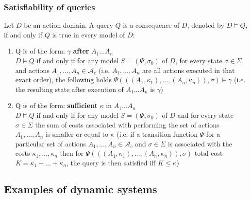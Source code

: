 \documentclass[a4paper]{article}
\begin{document}
\subsubsection{Satisfiability of queries}
Let $D$ be an action domain. A query $Q$ is a consequence of $D$, denoted by $D \models Q$, if and only if $Q$ is true in every model of $D$:
\begin{enumerate}
    \item Q is of the form: $\gamma$ \textbf{after} $A_1\dotsc A_n$ \\[0.5\baselineskip]
    $D \models Q$ if and only if for any model $S=(\Psi,\sigma_0)$ of $D$, for every state $\sigma\in\Sigma$ and actions $A_1,\dotsc,A_n\in\mathcal{A}_c$ (i.e. $A_1,\dotsc,A_n$ are all actions executed in that exact order), the following holds $\Psi(((A_1,\kappa_1),\dotsc,(A_n,\kappa_n)),\sigma)\models\gamma$ (i.e. the resulting state after execution of $A_1\dotsc A_n$ is $\gamma$)
    \item Q is of the form: \textbf{sufficient} $\kappa$ in $A_1\dotsc A_n$ \\[0.5\baselineskip]
    $D \models Q$ if and only if for any model $S=(\Psi,\sigma_0)$ of $D$ and for every state $\sigma\in\Sigma$ the sum of costs associated with performing the set of actions $A_1,\dotsc,A_n$ is smaller or equal to $\kappa$ (i.e. if a transition function $\Psi$ for a particular set of actions $A_1,\dotsc,A_n\in\mathcal{A}_c$ and $\sigma\in\Sigma$ is associated with the costs $\kappa_1,\dotsc,\kappa_n$ then for $\Psi(((A_1,\kappa_1),\dotsc,(A_n,\kappa_n)),\sigma)$ total cost $K=\kappa_1+\dotsc+\kappa_n$, the query is then satisfied iff $K\le\kappa$)
\end{enumerate}
\subsection{Examples of dynamic systems}
\end{document}
